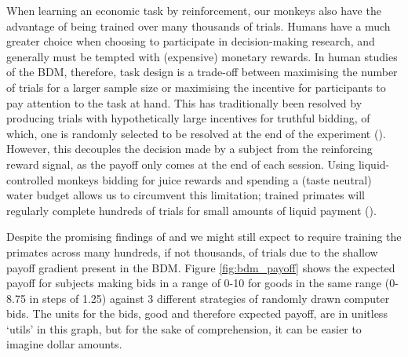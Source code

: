 When learning an economic task by reinforcement, our monkeys also have the advantage of being trained over many thousands of trials. Humans have a much greater choice when choosing to participate in decision-making research, and generally must be tempted with (expensive) monetary rewards. In human studies of the BDM, therefore, task design is a trade-off between maximising the number of trials for a larger sample size or maximising the incentive for participants to pay attention to the task at hand. This has traditionally been resolved by producing trials with hypothetically large incentives for truthful bidding, of which, one is randomly selected to be resolved at the end of the experiment (\cite{roosenValueElicitationUsing2010}). However, this decouples the decision made by a subject from the reinforcing reward signal, as the payoff only comes at the end of each session. Using liquid-controlled monkeys bidding for juice rewards and spending a (taste neutral) water budget allows us to circumvent this limitation; trained primates will regularly complete hundreds of trials for small amounts of liquid payment (\cite{grayPhysiologicalBehavioralScientific2016}).

Despite the promising findings of \cite{shogrenAuctionMechanismsMeasurement2001} and \cite{irwinPayoffDominanceVs1998} we might still expect to require training the primates across many hundreds, if not thousands, of trials due to the shallow payoff gradient present in the BDM. Figure \ref{fig:bdm_payoff} shows the expected payoff for subjects making bids in a range of 0-10 for goods in the same range (0-8.75 in steps of 1.25) against 3 different strategies of randomly drawn computer bids. The units for the bids, good and therefore expected payoff, are in unitless ‘utils’ in this graph, but for the sake of comprehension, it can be easier to imagine dollar amounts.


